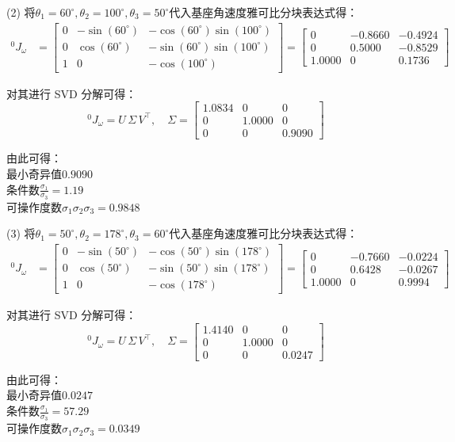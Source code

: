 \documentclass[UTF8, 13pt]{ctexart}
\begin{document}
(2)
将\(\theta_1 = 60^\circ, \theta_2 = 100^\circ, \theta_3 = 50^\circ\)代入基座角速度雅可比分块表达式得：
\[
\begin{aligned}
{}^0 J_{\omega}
&= \begin{bmatrix}
        0 & -\sin(60^\circ) & -\cos(60^\circ)\sin(100^\circ) \\
        0 & \cos(60^\circ) & -\sin(60^\circ)\sin(100^\circ) \\
        1 & 0 & -\cos(100^\circ)
    \end{bmatrix}
 = \begin{bmatrix}
        0 & -0.8660 & -0.4924 \\
        0 & 0.5000 & -0.8529 \\
        1.0000 & 0 & 0.1736
    \end{bmatrix}
\end{aligned}
\]

对其进行 SVD 分解可得：
\[
{}^0 J_{\omega} = U\, \Sigma\, V^{\top},\quad
\Sigma = \begin{bmatrix}
            1.0834 & 0 & 0 \\
            0 & 1.0000 & 0 \\
            0 & 0 & 0.9090
        \end{bmatrix}
\]

由此可得： \\
最小奇异值\(0.9090\) \\
条件数\(\frac{\sigma_1}{\sigma_3} = 1.19\) \\
可操作度数\(\sigma_1 \sigma_2 \sigma_3 = 0.9848\)
\vspace{5em}


(3)
将\(\theta_1 = 50^\circ, \theta_2 = 178^\circ, \theta_3 = 60^\circ\)代入基座角速度雅可比分块表达式得：
\[
\begin{aligned}
{}^0 J_{\omega}
&= \begin{bmatrix}
        0 & -\sin(50^\circ) & -\cos(50^\circ)\sin(178^\circ) \\
        0 & \cos(50^\circ) & -\sin(50^\circ)\sin(178^\circ) \\
        1 & 0 & -\cos(178^\circ)
    \end{bmatrix}
 = \begin{bmatrix}
        0 & -0.7660 & -0.0224 \\
        0 & 0.6428 & -0.0267 \\
        1.0000 & 0 & 0.9994
    \end{bmatrix}
\end{aligned}
\]

对其进行 SVD 分解可得：
\[
{}^0 J_{\omega} = U\, \Sigma\, V^{\top},\quad
\Sigma = \begin{bmatrix}
            1.4140 & 0 & 0 \\
            0 & 1.0000 & 0 \\
            0 & 0 & 0.0247
        \end{bmatrix}
\]

由此可得： \\
最小奇异值\(0.0247\) \\
条件数\(\frac{\sigma_1}{\sigma_3} = 57.29\) \\
可操作度数\(\sigma_1 \sigma_2 \sigma_3 = 0.0349\)
\end{document}
